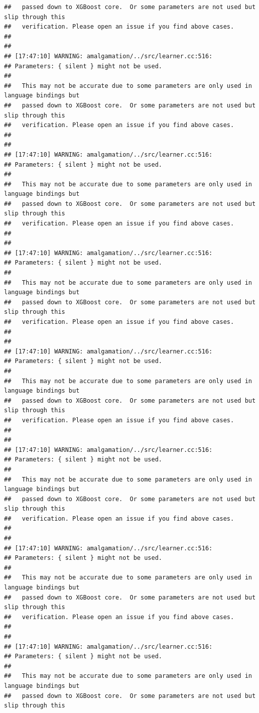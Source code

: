 \documentclass[AMS,STIX2COL]{WileyNJD-v2}\usepackage[]{graphicx}\usepackage[]{color}
\makeatletter
\newenvironment{kframe}{%
 \def\at@end@of@kframe{}%
 \ifinner\ifhmode%
  \def\at@end@of@kframe{\end{minipage}}%
  \begin{minipage}{\columnwidth}%
 \fi\fi%
 \def\FrameCommand##1{\hskip\@totalleftmargin \hskip-\fboxsep
 \colorbox{shadecolor}{##1}\hskip-\fboxsep
     \hskip-\linewidth \hskip-\@totalleftmargin \hskip\columnwidth}%
 \MakeFramed {\advance\hsize-\width
   \@totalleftmargin\z@ \linewidth\hsize
   \@setminipage}}%
 {\par\unskip\endMakeFramed%
 \at@end@of@kframe}
\newenvironment{knitrout}{}{} %
\makeatother
\begin{document}
\begin{knitrout}
\begin{kframe}
\begin{verbatim}
##   passed down to XGBoost core.  Or some parameters are not used but slip through this
##   verification. Please open an issue if you find above cases.
## 
## 
## [17:47:10] WARNING: amalgamation/../src/learner.cc:516: 
## Parameters: { silent } might not be used.
## 
##   This may not be accurate due to some parameters are only used in language bindings but
##   passed down to XGBoost core.  Or some parameters are not used but slip through this
##   verification. Please open an issue if you find above cases.
## 
## 
## [17:47:10] WARNING: amalgamation/../src/learner.cc:516: 
## Parameters: { silent } might not be used.
## 
##   This may not be accurate due to some parameters are only used in language bindings but
##   passed down to XGBoost core.  Or some parameters are not used but slip through this
##   verification. Please open an issue if you find above cases.
## 
## 
## [17:47:10] WARNING: amalgamation/../src/learner.cc:516: 
## Parameters: { silent } might not be used.
## 
##   This may not be accurate due to some parameters are only used in language bindings but
##   passed down to XGBoost core.  Or some parameters are not used but slip through this
##   verification. Please open an issue if you find above cases.
## 
## 
## [17:47:10] WARNING: amalgamation/../src/learner.cc:516: 
## Parameters: { silent } might not be used.
## 
##   This may not be accurate due to some parameters are only used in language bindings but
##   passed down to XGBoost core.  Or some parameters are not used but slip through this
##   verification. Please open an issue if you find above cases.
## 
## 
## [17:47:10] WARNING: amalgamation/../src/learner.cc:516: 
## Parameters: { silent } might not be used.
## 
##   This may not be accurate due to some parameters are only used in language bindings but
##   passed down to XGBoost core.  Or some parameters are not used but slip through this
##   verification. Please open an issue if you find above cases.
## 
## 
## [17:47:10] WARNING: amalgamation/../src/learner.cc:516: 
## Parameters: { silent } might not be used.
## 
##   This may not be accurate due to some parameters are only used in language bindings but
##   passed down to XGBoost core.  Or some parameters are not used but slip through this
##   verification. Please open an issue if you find above cases.
## 
## 
## [17:47:10] WARNING: amalgamation/../src/learner.cc:516: 
## Parameters: { silent } might not be used.
## 
##   This may not be accurate due to some parameters are only used in language bindings but
##   passed down to XGBoost core.  Or some parameters are not used but slip through this

\end{verbatim}
\end{kframe}
\end{knitrout}
\end{document}
